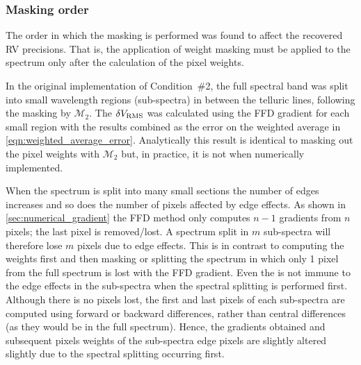 \subsubsection{Masking order}
\label{subsubsec:masking_order}
The order in which the masking is performed was found to affect the recovered RV precisions.
That is, the application of weight masking must be applied to the spectrum only after the calculation of the pixel weights.

In the original implementation of Condition~\#2, the full spectral band was split into small wavelength regions (sub-spectra) in between the telluric lines, following the masking by \(\mathcal{M}_{2}\).
The \(\delta V_{\textrm{RMS}}\) was calculated using the {FFD} gradient for each small region with the results combined as the error on the weighted average in \cref{eqn:weighted_average_error}.
Analytically this result is identical to masking out the pixel weights with \({\mathcal{M}}_{2}\) but, in practice, it is not when numerically implemented.

When the spectrum is split into many small sections the number of edges increases and so does the number of pixels affected by edge effects.
As shown in \cref{sec:numerical_gradient} the {FFD} method only computes \(n-1\) gradients from \(n\) pixels; the last pixel is removed/lost.
A spectrum split in \(m\) sub-spectra will therefore lose \(m\) pixels due to edge effects.
This is in contrast to computing the weights first and then masking or splitting the spectrum in which only 1 pixel from the full spectrum is lost with the {FFD} gradient.
Even the \npgradient{} is not immune to the edge effects in the sub-spectra when the spectral splitting is performed first.
Although there is no pixels lost, the first and last pixels of each sub-spectra are computed using forward or backward differences, rather than central differences (as they would be in the full spectrum).
Hence, the gradients obtained and subsequent pixels weights of the sub-spectra edge pixels are slightly altered slightly due to the spectral splitting occurring first.

